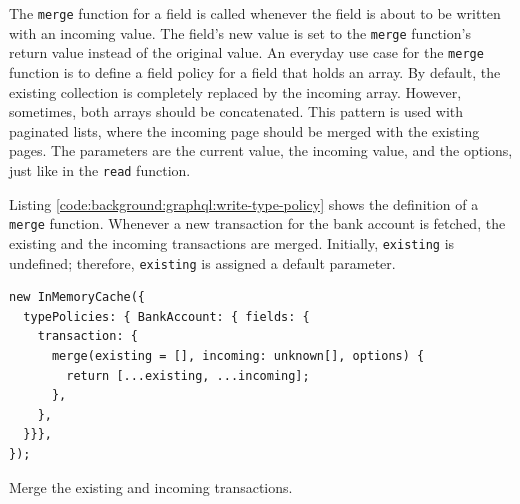 The \texttt{merge} function for a field is called whenever the field is about to be written with an incoming value. The field's new value is set to the \texttt{merge} function's return value instead of the original value.  An everyday use case for the \texttt{merge} function is to define a field policy for a field that holds an array. By default, the existing collection is completely replaced by the incoming array. However, sometimes, both arrays should be concatenated. This pattern is used with paginated lists, where the incoming page should be merged with the existing pages. The parameters are the current value, the incoming value, and the options, just like in the \texttt{read} function. \cite{misc:-:background:graphql:apollo-client-cache-reading-writing}

\bigskip

\noindent Listing \ref{code:background:graphql:write-type-policy} shows the definition of a \texttt{merge} function. Whenever a new transaction for the bank account is fetched, the existing and the incoming transactions are merged. Initially, \texttt{existing} is undefined; therefore, \texttt{existing} is assigned a default parameter.

\ifshowListings
\begin{listing}[H]
    \begin{verbatim}
new InMemoryCache({
  typePolicies: { BankAccount: { fields: {
    transaction: {
      merge(existing = [], incoming: unknown[], options) {
        return [...existing, ...incoming];
      },
    },
  }}},
});
    \end{verbatim}
    \caption{Merge the existing and incoming transactions.}\label{code:background:graphql:write-type-policy}
\end{listing}
\fi